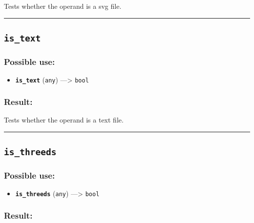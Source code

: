 \documentclass[]{book}
\providecommand{\tightlist}{%
  \setlength{\itemsep}{0pt}\setlength{\parskip}{0pt}}
\theoremstyle{definition}
\theoremstyle{definition}
\theoremstyle{definition}
\theoremstyle{remark}
\begin{document}
Tests whether the operand is a svg file.

\begin{center}\rule{0.5\linewidth}{\linethickness}\end{center}

\subsection{\texorpdfstring{\texttt{is\_text}}{is\_text}}\label{is_text}

\subsubsection{Possible use:}\label{possible-use-305}

\begin{itemize}
\tightlist
\item
  \textbf{\texttt{is\_text}} (\texttt{any}) ---\textgreater{}
  \texttt{bool}
\end{itemize}

\subsubsection{Result:}\label{result-295}

Tests whether the operand is a text file.

\begin{center}\rule{0.5\linewidth}{\linethickness}\end{center}

\subsection{\texorpdfstring{\texttt{is\_threeds}}{is\_threeds}}\label{is_threeds}

\subsubsection{Possible use:}\label{possible-use-306}

\begin{itemize}
\tightlist
\item
  \textbf{\texttt{is\_threeds}} (\texttt{any}) ---\textgreater{}
  \texttt{bool}
\end{itemize}

\subsubsection{Result:}\label{result-296}
\end{document}
